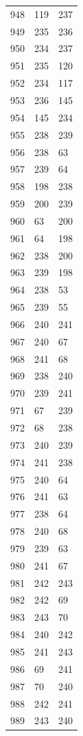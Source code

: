 \documentclass[a4paper,11pt]{article}
\begin{document}
\begin{center}
\begin{longtable}{|R{1.5cm}|R{1.5cm}|R{1.5cm}|}
  948 &  119 &  237 \\
  949 &  235 &  236 \\
  950 &  234 &  237 \\
  951 &  235 &  120 \\
  952 &  234 &  117 \\
  953 &  236 &  145 \\
  954 &  145 &  234 \\
  955 &  238 &  239 \\
  956 &  238 &   63 \\
  957 &  239 &   64 \\
  958 &  198 &  238 \\
  959 &  200 &  239 \\
  960 &   63 &  200 \\
  961 &   64 &  198 \\
  962 &  238 &  200 \\
  963 &  239 &  198 \\
  964 &  238 &   53 \\
  965 &  239 &   55 \\
  966 &  240 &  241 \\
  967 &  240 &   67 \\
  968 &  241 &   68 \\
  969 &  238 &  240 \\
  970 &  239 &  241 \\
  971 &   67 &  239 \\
  972 &   68 &  238 \\
  973 &  240 &  239 \\
  974 &  241 &  238 \\
  975 &  240 &   64 \\
  976 &  241 &   63 \\
  977 &  238 &   64 \\
  978 &  240 &   68 \\
  979 &  239 &   63 \\
  980 &  241 &   67 \\
  981 &  242 &  243 \\
  982 &  242 &   69 \\
  983 &  243 &   70 \\
  984 &  240 &  242 \\
  985 &  241 &  243 \\
  986 &   69 &  241 \\
  987 &   70 &  240 \\
  988 &  242 &  241 \\
  989 &  243 &  240 \\

\end{longtable}
\end{center}
\end{document}
